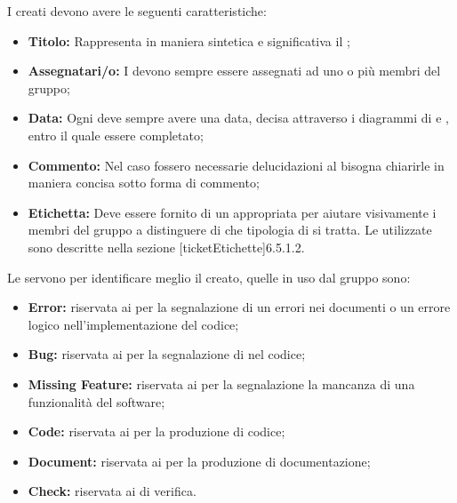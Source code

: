 \documentclass[12pt,a4paper]{article}
\begin{document}
\label{ticketStruttura}
I \textit{} creati devono avere le seguenti caratteristiche:
\begin{itemize}
	\item \textbf{Titolo:} Rappresenta in maniera sintetica e significativa il \textit{};
	\item \textbf{Assegnatari/o:} I \textit{} devono sempre essere assegnati ad uno o più membri del gruppo;
	\item \textbf{Data:} Ogni \textit{} deve sempre avere una data, decisa attraverso i diagrammi di  e , entro il quale essere completato;
	\item \textbf{Commento:} Nel caso fossero necessarie delucidazioni al \textit{} bisogna chiarirle in maniera concisa sotto forma di commento;
	\item \textbf{Etichetta:} Deve essere fornito di un appropriata  per aiutare visivamente i membri del gruppo a distinguere di che tipologia di \textit{} si tratta. 
	Le  utilizzate sono descritte nella sezione  [ticketEtichette]{6.5.1.2}.
\end{itemize}


\label{ticketEtichette}
Le  servono per identificare meglio il \textit{} creato, quelle in uso dal gruppo sono:
\begin{itemize}
	\item \textbf{Error:} riservata ai \textit{} per la segnalazione di  un errori nei documenti o un errore logico nell'implementazione del codice;
	\item \textbf{Bug:} riservata ai \textit{} per la segnalazione di  nel codice;
	\item \textbf{Missing Feature:} riservata ai \textit{} per la segnalazione la mancanza di una funzionalità del software;
	\item \textbf{Code:} riservata ai \textit{} per la produzione di codice;
	\item \textbf{Document:} riservata ai \textit{} per la produzione di documentazione;
	\item \textbf{Check:} riservata ai \textit{} di verifica.
\end{itemize}
\end{document}
